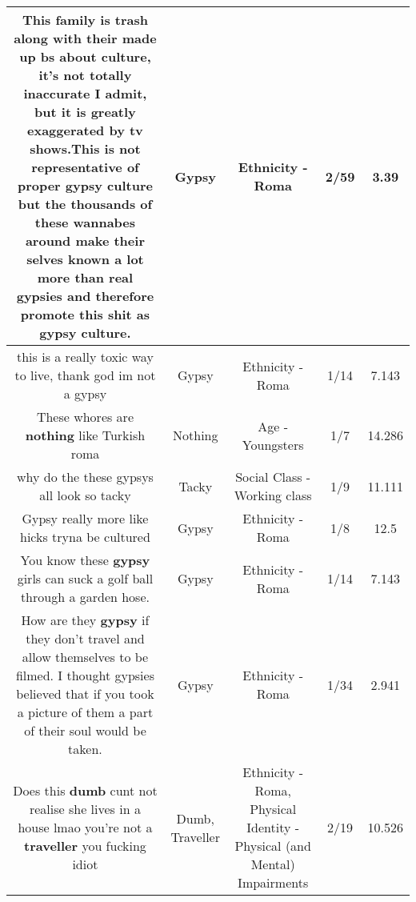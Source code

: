 \documentclass[11pt]{article}
\newlength\mylength
\begin{document}
\begin{center}
\begin{longtable}{|C{.65\mylength}|C{.30\mylength}|C{.12\mylength}|C{.12\mylength}|C{.12\mylength}|}
  \small This family is trash along with their made up bs about culture, it's not totally inaccurate I admit, but it is greatly exaggerated by tv shows.This is not representative of proper \textbf{gypsy} culture but the thousands of these wannabes around make their selves known a lot more than real gypsies and therefore promote this shit as \textbf{gypsy} culture.\normalsize   & Gypsy & Ethnicity - Roma & 2/59 & 3.39 \\  \hline
  \small this is a really toxic way to live, thank god im not a gypsy\normalsize   & Gypsy & Ethnicity - Roma & 1/14 & 7.143 \\  \hline
  \small These whores are \textbf{nothing} like Turkish roma\normalsize   & Nothing & Age - Youngsters & 1/7 & 14.286 \\  \hline
  \small why do the these gypsys all look so tacky\normalsize   & Tacky & Social Class - Working class & 1/9 & 11.111 \\  \hline
  \small Gypsy really more like hicks tryna be cultured\normalsize   & Gypsy & Ethnicity - Roma & 1/8 & 12.5 \\  \hline
  \small You know these \textbf{gypsy} girls can suck a golf ball through a garden hose.\normalsize   & Gypsy & Ethnicity - Roma & 1/14 & 7.143 \\  \hline
  \small How are they \textbf{gypsy} if they don't travel and allow themselves to be filmed. I thought gypsies believed that if you took a picture of them a part of their soul would be taken.\normalsize   & Gypsy & Ethnicity - Roma & 1/34 & 2.941 \\  \hline
  \small Does this \textbf{dumb} cunt not realise she lives in a house lmao you're not a \textbf{traveller} you fucking idiot\normalsize   & Dumb, Traveller & Ethnicity - Roma, Physical Identity - Physical (and Mental) Impairments & 2/19 & 10.526 \\  \hline

\end{longtable}
\end{center}
\end{document}
